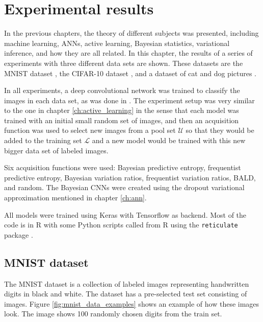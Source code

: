 
\chapter{Experimental results}
\label{ch:results}

In the previous chapters, the theory of different subjects was presented, including machine learning, ANNs, active learning, Bayesian statistics, variational inference, and how they are all related. In this chapter, the results of a series of experiments with three different data sets are shown. These datasets are the MNIST dataset \cite{lecun1998gradient}, the CIFAR-10 dataset \cite{krizhevsky2009learning}, and a dataset of cat and dog pictures \cite{elson2007asirra}.

In all experiments, a deep convolutional network was trained to classify the images in each data set, as was done in \cite{Gal2016Active}. The experiment setup was very similar to the one in chapter \ref{ch:active_learning} in the sense that each model was trained with an initial small random set of images, and then an acquisition function was used to select new images from a pool set $\mathcal{U}$ so that they would be added to the training set $\mathcal{L}$ and a new model would be trained with this new bigger data set of labeled images.

Six acquisition functions were used: Bayesian predictive entropy, frequentist predictive entropy, Bayesian variation ratios, frequentist variation ratios, BALD, and random. The Bayesian CNNs were created using the dropout variational approximation mentioned in chapter \ref{ch:ann}.

All models were trained using Keras\cite{chollet2015keras} with Tensorflow \cite{tensorflow2015-whitepaper} as backend. Most of the code is in R with some Python scripts called from R using the \texttt{reticulate} package \cite{reticulate_package}.

\section{MNIST dataset}

The MNIST dataset is a collection of  labeled images representing handwritten digits in black and white. The dataset has a pre-selected test set consisting of  images. Figure \ref{fig:mnist_data_examples} shows an example of how these images look. The image shows 100 randomly chosen digits from the train set.

